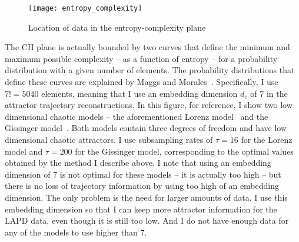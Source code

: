 \begin{figure}
\centerline{\texttt{[image: entropy\_complexity]}}
\caption{Location of data in the entropy-complexity plane}
\label{entropy_complexity}
\end{figure}

The CH plane is actually bounded by two curves that define the minimum and maximum possible complexity -- as a function of entropy --
for a probability distribution with a given number of elements. The probability
distributions that define these curves are explained by Maggs and Morales~\cite{maggs2013}. Specifically, I use $7!=5040$ elements, meaning that I use an embedding dimension $d_e$ of $7$
in the attractor trajectory reconstructions.
In this figure, for reference, I show two low dimensional chaotic models -- the aforementioned Lorenz model~\cite{lorenz1963} and the Gissinger model~\cite{gissinger2012}. 
Both models contain three degrees of freedom and have low dimensional chaotic attractors. I use subsampling rates of $\tau=16$ for the Lorenz model and $\tau=200$ for the Gissinger model, corresponding
to the optimal values obtained by the method I describe above. I note that using an embedding dimension of $7$ is not optimal for these models -- it is actually too high -- but there is no
loss of trajectory information by using too high of an embedding dimension. The only problem is the need for larger amounts of data. I use this embedding dimension so that I can keep more
attractor information for the LAPD data, even though it is still too low. And I do not have enough data for any of the models to use higher than $7$. 

